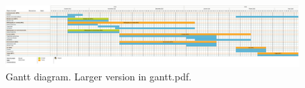 \documentclass[a4paper,11pt]{article}
\begin{document}
\begin{figure}[h]
  \begin{center}
    \includegraphics[width=15cm]{gantt.pdf}
    \caption{Gantt diagram. Larger version in gantt.pdf.}
    \label{fig:gantt}
  \end{center}
\end{figure}













\newpage
\begingroup




\endgroup
\end{document}
